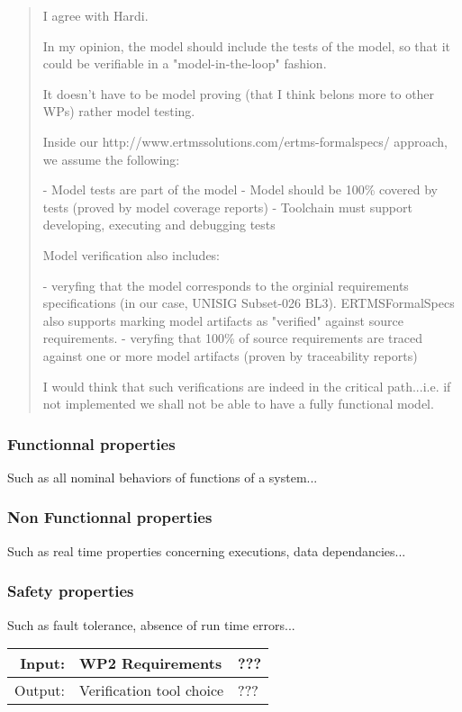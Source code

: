 \documentclass[11pt, a4paper]{article}
\newenvironment{inoutput}
{\vspace{2mm}
\noindent
\begin{tabular}{|r|p{.7\linewidth}|l|}
\hline}
{
\hline
\end{tabular}}
\begin{document}
\begin{quotation}
 I agree with Hardi. 

In my opinion, the model should include the tests of the model, so that it could be verifiable in a "model-in-the-loop" fashion.

It doesn't have to be model proving (that I think belons more to other WPs) rather model testing.

Inside our http://www.ertmssolutions.com/ertms-formalspecs/ approach, we assume the following:

- Model tests are part of the model
- Model should be 100\% covered by tests (proved by model coverage reports)
- Toolchain must support developing, executing and debugging tests

Model verification also includes:

- veryfing that the model corresponds to the orginial requirements specifications (in our case, UNISIG Subset-026 BL3). ERTMSFormalSpecs also supports marking model artifacts as "verified" against source requirements.
- veryfing that 100\% of source requirements are traced against one or more model artifacts (proven by traceability reports)

I would think that such verifications are indeed in the critical path...i.e. if not implemented we shall not be able to have a fully functional model.

\end{quotation}
\subsubsection{Functionnal properties}

Such as all nominal behaviors of functions of a system...


\subsubsection{Non Functionnal properties}

Such as real time properties concerning executions, data dependancies...


\subsubsection{Safety properties}

Such as fault tolerance, absence of run time errors...

\begin{inoutput}
Input: & WP2 Requirements & ??? \\
\hline
Output: & Verification tool choice & ??? \\
\end{inoutput}
\end{document}
